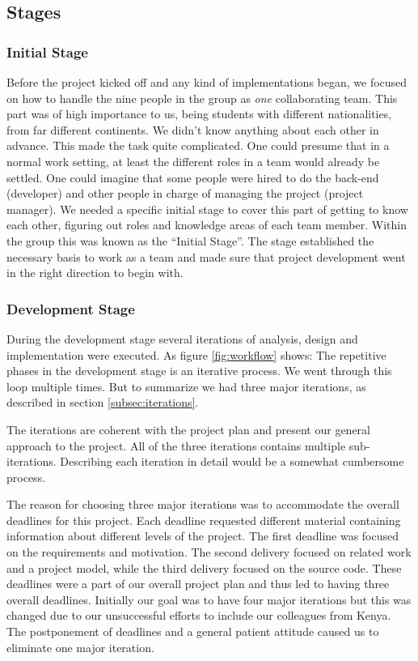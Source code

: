 \subsection{Stages} \label{subsec:stages}

\subsubsection{Initial Stage}
Before the project kicked off and any kind of implementations began, we focused on how to handle the nine people in the group as \textit{one} collaborating team. 
This part was of high importance to us, being students with different nationalities, from far different continents. We didn't know anything about each other in advance. This made the task quite complicated. One could presume that in a normal work setting, at least the different roles in a team would already be settled. One could imagine that some people were hired to do the back-end (developer) and other people in charge of managing the project (project manager). 
We needed a specific initial stage to cover this part of getting to know each other, figuring out roles and knowledge areas of each team member. Within the group this was known as the ``Initial Stage''. The stage established the necessary basis to work as a team and made sure that project development went in the right direction to begin with.

\subsubsection{Development Stage}
During the development stage several iterations of analysis, design and implementation were executed. As figure \ref{fig:workflow} shows: The repetitive phases in the development stage is an iterative process. We went through this loop multiple times. But to summarize we had three major iterations, as described in section \ref{subsec:iterations}. 

The iterations are coherent with the project plan and present our general approach to the project. All of the three iterations contains multiple sub-iterations. Describing each iteration in detail would be a somewhat cumbersome process.

The reason for choosing three major iterations was to accommodate the overall deadlines for this project. Each deadline requested different material containing information about different levels of the project. The first deadline was focused on the requirements and motivation. The second delivery focused on related work and a project model, while the third delivery focused on the source code. These deadlines were a part of our overall project plan and thus led to having three overall deadlines. Initially our goal was to have four major iterations but this was changed due to our unsuccessful efforts to include our colleagues from Kenya. The postponement of deadlines and a general patient attitude caused us to eliminate one major iteration. 

